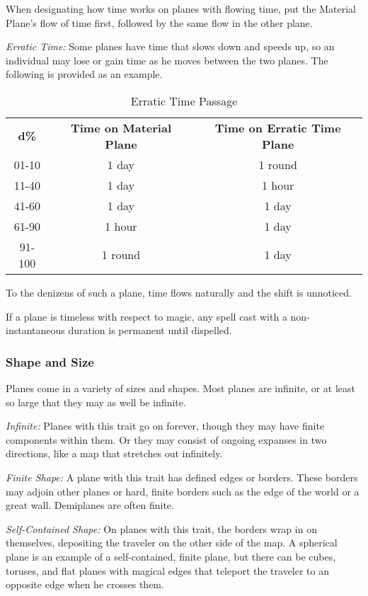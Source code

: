 When designating how time works on planes with flowing time, put the Material Plane's 
flow of time first, followed by the same flow in the other plane. 

\textit{Erratic Time:} Some planes have time that slows down and speeds up, so 
an individual may lose or gain time as he moves between the two planes. The following 
is provided as an example.

\begin{table}[htb]
\caption{Erratic Time Passage}
\centering
\begin{tabular}{ccc}
\textbf{d\%} & \textbf{Time on Material Plane} & \textbf{Time on Erratic Time Plane}\\
01-10 & 1 day & 1 round\\
11-40 & 1 day & 1 hour\\
41-60 & 1 day & 1 day\\
61-90 & 1 hour & 1 day\\
91-100 & 1 round & 1 day\\
\end{tabular}
\end{table}

To the denizens of such a plane, time flows naturally and the shift is unnoticed.

If a plane is timeless with respect to magic, any spell cast with a non-instantaneous 
duration is permanent until dispelled.

\subsubsection{Shape and Size}

Planes come in a variety of sizes and shapes. Most planes 
are infinite, or at least so large that they may as well be infinite.

\textit{Infinite:} Planes with this trait go on forever, though they may have finite 
components within them. Or they may consist of ongoing expanses in two directions, 
like a map that stretches out infinitely.

\textit{Finite Shape:} A plane with this trait has defined edges or borders. These 
borders may adjoin other planes or hard, finite borders such as the edge of the 
world or a great wall. Demiplanes are often finite.

\textit{Self-Contained Shape:} On planes with this trait, the borders wrap in on 
themselves, depositing the traveler on the other side of the map. A spherical plane 
is an example of a self-contained, finite plane, but there can be cubes, toruses, 
and flat planes with magical edges that teleport the traveler to an opposite edge 
when he crosses them. 

